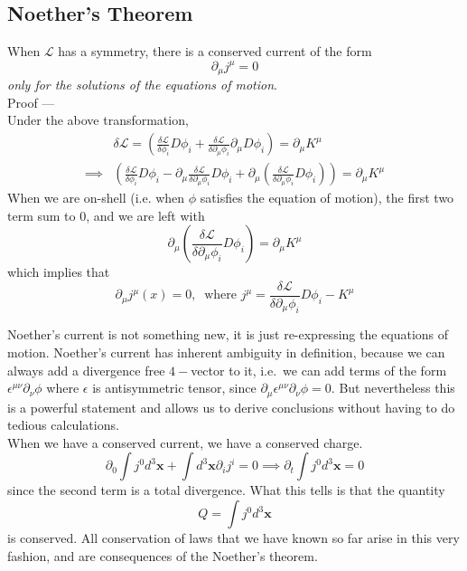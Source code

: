\documentclass[11pt, notitlepage]{report}
\newcommand{\del}{\partial}
\newcommand{\ld}{\mathcal{L}}
\numberwithin{equation}{section}
\begin{document}
    \subsection{Noether's Theorem}
    When \(\ld\) has a symmetry, there is a conserved current of the form
    \begin{equation*}
        \del_\mu j^\mu = 0
    \end{equation*} 
    \textit{only for the solutions of the equations of motion}.\\

    Proof —\\
    Under the above transformation,
    \begin{align*}
        &\delta \ld = \left( \frac{\delta \ld}{\delta \phi_i} D\phi_i  + \frac{\delta \ld}{\delta \del_\mu \phi_i} \del_\mu D\phi_i \right) = \del_\mu K^\mu \\
        \implies & \left( \frac{\delta \ld}{\delta \phi_i} D\phi_i  -\del_\mu \frac{\delta \ld}{\delta \del_\mu \phi_i} D\phi_i + \del_\mu \left( \frac{\delta \ld}{\delta \del_\mu \phi_i} D\phi_i \right)  \right) = \del_\mu K^\mu 
    \end{align*}
    When we are on-shell (i.e. when \(\phi\) satisfies the equation of motion), the first two term sum to 0, and we are left with 
    \begin{equation*}
        \del_\mu \left( \frac{\delta \ld}{\delta \del_\mu \phi_i} D\phi_i \right) = \del_\mu K^\mu
    \end{equation*}
    which implies that  
    \begin{equation*}
        \del_\mu j^\mu(x) =0, ~\text{ where  } j^\mu = \frac{\delta \ld}{\delta \del_\mu \phi_i} D\phi_i  - K^\mu 
    \end{equation*}

    Noether's current is not something new, it is just re-expressing the equations of motion. Noether's current has inherent ambiguity in definition, because we can always add a divergence free \(4-\)vector to it, i.e.\ we can add terms of the form \(\epsilon^{\mu\nu} \del_\nu \phi\) where \(\epsilon\) is antisymmetric tensor, since \(\del_\mu \epsilon^{\mu\nu} \del_\nu \phi = 0\). But nevertheless this is a powerful statement and allows us to derive conclusions without having to do tedious calculations.\\

    When we have a conserved current, we have a conserved charge.
    \begin{equation*}
        \del_0 \int j^0 d^3\textbf{x} + \int d^3\textbf{x} \del_i j^i = 0 \implies \del_t \int j^0 d^3\textbf{x} = 0
    \end{equation*}
    since the second term is a total divergence. What this tells is that the quantity 
    \begin{equation*}
        Q = \int j^0 d^3\textbf{x}
    \end{equation*} 
    is conserved. All conservation of laws that we have known so far arise in this very fashion, and are consequences of the Noether's theorem.\\
\end{document}
